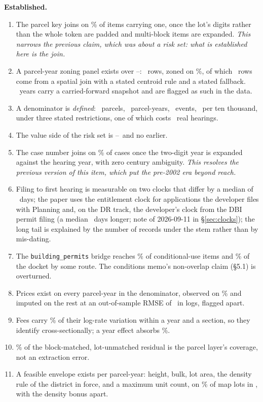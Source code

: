 \documentclass[11pt]{article}
\begin{document}
\textbf{Established.}
\begin{enumerate}
\item The parcel key joins on \acqParcelJoin\% of items carrying one, once the lot's digits
rather than the whole token are padded and multi-block items are expanded. \emph{This narrows
the previous claim, which was about a risk set: what is established here is the join.}
\item A parcel-year zoning panel exists over \acqPanelFirst--\acqPanelLast: \acqPanelRows\
rows, zoned on \acqPanelZoned\%, of which \acqPanelBySpatial\ rows come from a spatial join
with a stated centroid rule and a stated fallback. \acqSnapshotYears\ years carry a
carried-forward snapshot and are flagged as such in the data.
\item A denominator is \emph{defined}: \acqRiskParcels\ parcels, \acqRiskParcelYears\
parcel-years, \acqRiskEvents\ events, \acqRiskRate\ per ten thousand, under three stated
restrictions, one of which costs \acqRiskCondoLost\ real hearings.
\item The value side of the risk set is \acqAsrFirst--\acqAsrLast\ and no earlier.
\item The case number joins on \acqCaseAny\% of cases once the two-digit year is expanded
against the hearing year, with zero century ambiguity. \emph{This resolves the previous
version of this item, which put the pre-2002 era beyond reach.}
\item Filing to first hearing is measurable on two clocks that differ by a median of
\acqClockGapMed\ days; the paper uses the entitlement clock for applications the developer files
with Planning and, on the DR track, the developer's clock from the DBI permit filing (a median
\pcDrDiffMed\ days longer; note of 2026-09-11 in \S\ref{sec:clocks}); the long tail is explained by
the number of records under the stem rather than by mis-dating.
\item The \texttt{building\_permits} bridge reaches \acqBridgeCU\% of conditional-use items and
\acqEitherRoute\% of the docket by some route. The conditions memo's non-overlap claim
(\S5.1) is overturned.
\item Prices exist on every parcel-year in the denominator, observed on \acqPriceObserved\%
and imputed on the rest at an out-of-sample RMSE of \acqPriceRmse\ in logs, flagged apart.
\item Fees carry \acqFeeWithin\% of their log-rate variation within a year and a section, so
they identify cross-sectionally; a year effect absorbs \acqFeeAbsYear\%.
\item \acqHandTopPct\% of the block-matched, lot-unmatched residual is the parcel layer's
coverage, not an extraction error.
\item A feasible envelope exists per parcel-year: height, bulk, lot area, the density rule of
the district in force, and a maximum unit count, on \envPriced\% of map lots in \envYearLast,
with the density bonus apart.
\end{enumerate}
\end{document}
